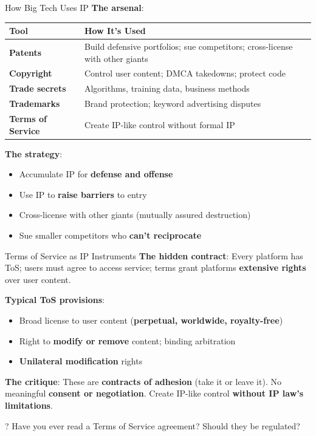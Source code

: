 \documentclass[aspectratio=169]{beamer}
\begin{document}
\begin{frame}{How Big Tech Uses IP}
\textbf{The arsenal}:

\begin{table}[h]
\centering
\small
\begin{tabular}{>{\bfseries}l p{7.5cm}}
\toprule
Tool & How It's Used \\
\midrule
Patents & Build defensive portfolios; sue competitors; cross-license with other giants \\
Copyright & Control user content; DMCA takedowns; protect code \\
Trade secrets & Algorithms, training data, business methods \\
Trademarks & Brand protection; keyword advertising disputes \\
Terms of Service & Create IP-like control without formal IP \\
\bottomrule
\end{tabular}
\end{table}

\vspace{0.2cm}
\textbf{The strategy}:
\begin{itemize}
    \item Accumulate IP for \textbf{defense and offense}
    \item Use IP to \textbf{raise barriers} to entry
    \item Cross-license with other giants (mutually assured destruction)
    \item Sue smaller competitors who \textbf{can't reciprocate}
\end{itemize}
\end{frame}

\begin{frame}{Terms of Service as IP Instruments}
\textbf{The hidden contract}: Every platform has ToS; users must agree to access service; terms grant platforms \textbf{extensive rights} over user content.

\vspace{0.2cm}
\textbf{Typical ToS provisions}:
\begin{itemize}
    \item Broad license to user content (\textbf{perpetual, worldwide, royalty-free})
    \item Right to \textbf{modify or remove} content; binding arbitration
    \item \textbf{Unilateral modification} rights
\end{itemize}

\vspace{0.1cm}
\textbf{The critique}: These are \textbf{contracts of adhesion} (take it or leave it). No meaningful \textbf{consent or negotiation}. Create IP-like control \textbf{without IP law's limitations}.

\begin{alertblock}{?}
Have you ever read a Terms of Service agreement? Should they be regulated?
\end{alertblock}
\end{frame}
\end{document}
